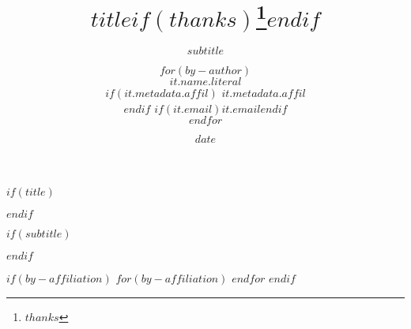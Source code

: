 $if(title)$
\title{$title$$if(thanks)$\thanks{$thanks$}$endif$}
$endif$

$if(subtitle)$
\subtitle{$subtitle$}
$endif$

\author{
$for(by-author)$
  \begin{minipage}[t]{0.28\textwidth}
    \centering
    $it.name.literal$\par
    $if(it.metadata.affil)$
    \textnormal\small{$it.metadata.affil$}\par
    $endif$
    $if(it.email)$\small\texttt{$it.email$}$endif$
  \end{minipage}%
  \hspace{0.05\textwidth} %
$endfor$
}



$if(by-affiliation)$
$for(by-affiliation)$
$endfor$
$endif$


\date{$date$}

